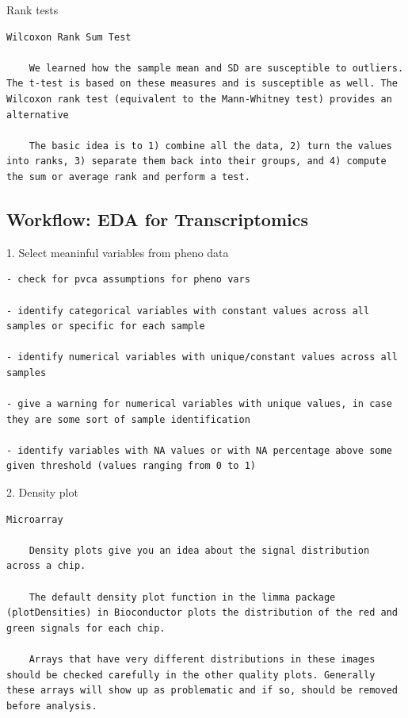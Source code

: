 \documentclass[
]{book}
\begin{document}
Rank tests

\begin{verbatim}
Wilcoxon Rank Sum Test

    We learned how the sample mean and SD are susceptible to outliers. The t-test is based on these measures and is susceptible as well. The Wilcoxon rank test (equivalent to the Mann-Whitney test) provides an alternative

    The basic idea is to 1) combine all the data, 2) turn the values into ranks, 3) separate them back into their groups, and 4) compute the sum or average rank and perform a test.
\end{verbatim}

\hypertarget{workflow-eda-for-transcriptomics}{%
\subsection{Workflow: EDA for Transcriptomics}\label{workflow-eda-for-transcriptomics}}

1. Select meaninful variables from pheno data

\begin{verbatim}
- check for pvca assumptions for pheno vars

- identify categorical variables with constant values across all samples or specific for each sample

- identify numerical variables with unique/constant values across all samples

- give a warning for numerical variables with unique values, in case they are some sort of sample identification

- identify variables with NA values or with NA percentage above some given threshold (values ranging from 0 to 1)
\end{verbatim}

2. Density plot

\begin{verbatim}
Microarray

    Density plots give you an idea about the signal distribution across a chip.

    The default density plot function in the limma package (plotDensities) in Bioconductor plots the distribution of the red and green signals for each chip.

    Arrays that have very different distributions in these images should be checked carefully in the other quality plots. Generally these arrays will show up as problematic and if so, should be removed before analysis.
\end{verbatim}
\end{document}
